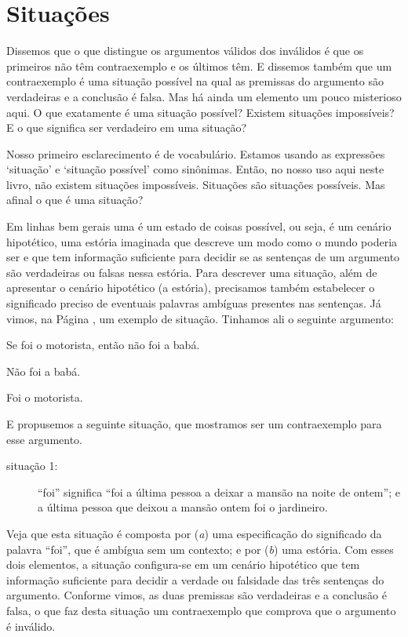 \section{Situações}
\label{ss:Validade}
Dissemos que o que distingue os argumentos válidos dos inválidos é que os primeiros não têm contraexemplo e os últimos têm.
E dissemos também que um contraexemplo é uma situação possível na qual as premissas do argumento são verdadeiras e a conclusão é falsa. 
Mas há ainda um elemento um pouco misterioso aqui.
O que exatamente é uma situação possível?
Existem situações impossíveis?
E o que significa ser verdadeiro em uma situação?

Nosso primeiro esclarecimento é de vocabulário.
Estamos usando as expressões `situação' e `situação possível' como sinônimas.
Então, no nosso uso aqui neste livro, não existem situações impossíveis.
Situações são situações possíveis.
Mas afinal o que é uma situação?

Em linhas bem gerais uma  é um estado de coisas possível, ou seja, é um cenário hipotético, uma estória imaginada que descreve um modo como o mundo poderia ser e que tem informação suficiente para decidir se as sentenças de um argumento são verdadeiras ou falsas nessa estória.
Para descrever uma situação, além de apresentar o cenário hipotético (a estória), precisamos também estabelecer o significado preciso de eventuais palavras ambíguas presentes nas sentenças.
Já vimos, na Página \pageref{argMaidDriver}, um exemplo de situação. %
Tinhamos ali o seguinte argumento:
 
 \begin{earg}
 	\item[] Se foi o motorista, então não foi a babá.
 	\item[] Não foi a babá.
 	\item[\therefore] Foi o motorista.
 \end{earg}
E propusemos a seguinte situação, que mostramos ser um contraexemplo para esse argumento.

\begin{description}
	\item[situação 1:] ``foi'' significa ``foi a última pessoa a deixar a mansão na noite de ontem''; e a última pessoa que deixou a mansão ontem foi o jardineiro.
\end{description}
Veja que esta situação é composta por (\textit{a}) uma especificação do significado da palavra ``foi'', que é ambígua sem um contexto; e por (\textit{b}) uma estória.
Com esses dois elementos, a situação configura-se em um cenário hipotético que tem informação suficiente para decidir a verdade ou falsidade das três sentenças do argumento.
Conforme vimos, as duas premissas são verdadeiras e a conclusão é falsa, o que faz desta situação um contraexemplo que comprova que o argumento é inválido.

